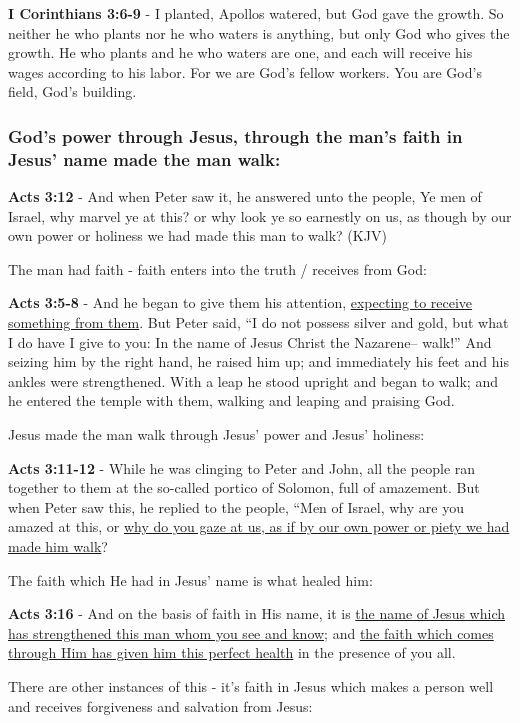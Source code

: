 \documentclass[11pt]{article}
\begin{document}
\textbf{I Corinthians 3:6-9} - I planted, Apollos watered, but God gave the growth. So neither he who plants nor he who waters is anything, but only God who gives the growth. He who plants and he who waters are one, and each will receive his wages according to his labor. For we are God's fellow workers. You are God's field, God's building.

\subsubsection{God's power through Jesus, through the man's faith in Jesus' name made the man walk:}
\label{sec:org897c84c}

\textbf{Acts 3:12} - And when Peter saw it, he answered unto the people, Ye men of Israel, why marvel ye at this? or why look ye so earnestly on us, as though by our own power or holiness we had made this man to walk? (KJV)

The man had faith - faith enters into the truth / receives from God:

\textbf{Acts 3:5-8} - And he began to give them his attention, \uline{expecting to receive something from them}. But Peter said, “I do not possess silver and gold, but what I do have I give to you: In the name of Jesus Christ the Nazarene-- walk!” And seizing him by the right hand, he raised him up; and immediately his feet and his ankles were strengthened. With a leap he stood upright and began to walk; and he entered the temple with them, walking and leaping and praising God.

Jesus made the man walk through Jesus' power and Jesus' holiness:

\textbf{Acts 3:11-12} - While he was clinging to Peter and John, all the people ran together to them at the so-called portico of Solomon, full of amazement. But when Peter saw this, he replied to the people, “Men of Israel, why are you amazed at this, or \uline{why do you gaze at us, as if by our own power or piety we had made him walk}?

The faith which He had in Jesus' name is what healed him:

\textbf{Acts 3:16} - And on the basis of faith in His name, it is \uline{the name of Jesus which has strengthened this man whom you see and know}; and \uline{the faith which comes through Him has given him this perfect health} in the presence of you all.

There are other instances of this - it's faith in Jesus which makes a person well and receives forgiveness and salvation from Jesus:
\end{document}
